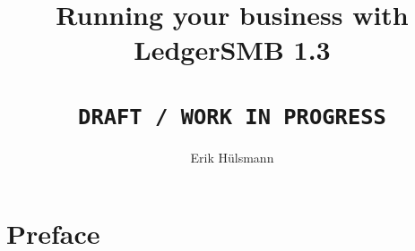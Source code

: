 \documentclass[10pt,A4]{book}
\begin{document}
\author{Erik H\"ulsmann}
\title{Running your business with \\
LedgerSMB 1.3 \\
 ~ \\
\texttt{DRAFT / WORK IN PROGRESS} }


\maketitle


\tableofcontents



\chapter*{Preface}








\end{document}
